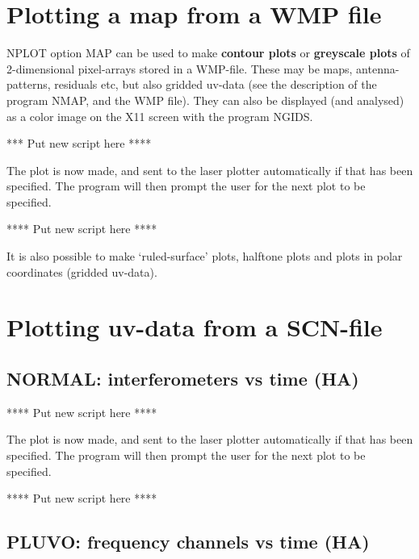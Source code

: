 \section{Plotting a map from a WMP file} 
\label{.map} 

NPLOT option MAP can be used to make {\bf contour plots} or {\bf greyscale
plots} of 2-dimensional pixel-arrays stored in a  WMP-file.  These may be maps,
antenna-patterns, residuals etc, but also gridded uv-data (see the description
of the program NMAP, and the WMP file).  They can also be displayed (and
analysed) as a color image on the X11 screen with the program NGIDS. 


*** Put new script here **** 


The plot is now made, and sent to the laser plotter automatically if that has
been specified. The program will then prompt the user for the next plot  to be
specified. 


**** Put new script here **** 


It is also possible to make `ruled-surface' plots, halftone plots and plots in
polar coordinates (gridded uv-data). 


\section{Plotting uv-data from a SCN-file} 
\label{.data} 


\subsection{NORMAL: interferometers vs time (HA)} 
\label{.data.normal} 

**** Put new script here **** 


The plot is now made, and sent to the laser plotter automatically if that has
been specified. The program will then prompt the user for the next plot  to be
specified. 


**** Put new script here **** 


\subsection{PLUVO: frequency channels vs time (HA)} 
\label{.pluvo} 



